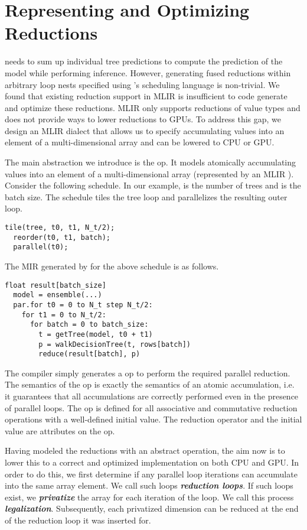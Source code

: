 \section{Representing and Optimizing Reductions}
\label{sec:reduction}
\Treebeard{} needs to sum up individual tree predictions to compute 
the prediction of the model while performing inference. However,
generating fused reductions within arbitrary loop nests specified 
using \Treebeard{}'s scheduling language is non-trivial. We found 
that existing reduction support in MLIR is insufficient to code
generate and optimize these reductions. MLIR only supports reductions
of value types and does not provide ways to lower reductions to GPUs. 
To address this gap, we design an MLIR dialect that allows us to
specify accumulating values into an element of a multi-dimensional array
and can be lowered to CPU or GPU. 

The main abstraction we introduce is the  op. It models 
atomically accumulating values into an element of a 
multi-dimensional array (represented by an MLIR ).
Consider the following \Treebeard{} schedule.
In our example,  is the number of trees 
and  is the batch size. The schedule tiles the 
tree loop and parallelizes the resulting outer loop.
\begin{lstlisting}[style=c++]
  tile(tree, t0, t1, N_t/2);
  reorder(t0, t1, batch);
  parallel(t0);
\end{lstlisting}

The MIR generated by \Treebeard{} for the above schedule is as follows. 
\begin{lstlisting}[style=c++]
  float result[batch_size]
  model = ensemble(...) 
  par.for t0 = 0 to N_t step N_t/2:
    for t1 = 0 to N_t/2:
      for batch = 0 to batch_size:
        t = getTree(model, t0 + t1) 
        p = walkDecisionTree(t, rows[batch])
        reduce(result[batch], p)
\end{lstlisting}

The compiler simply generates a  op to perform
the required parallel reduction. 
The semantics of the  op is exactly the semantics of 
an atomic accumulation, i.e. it guarantees that all accumulations 
are correctly performed even in the presence of parallel loops. 
The  op is defined for all associative and commutative
reduction operations with a well-defined initial value. The 
reduction operator and the initial value are attributes
on the  op. 

Having modeled the reductions with an abstract operation, the 
aim now is to lower this to a correct and optimized 
implementation on both CPU and GPU. In order to do this, we 
first determine if any parallel loop iterations can accumulate 
into the same array element. We call such loops 
\emph{\textbf{reduction loops}}. If such loops exist, we 
\textbf{\emph{privatize}} the array for each iteration of the
loop. We call this process \textbf{\emph{legalization}}.
Subsequently, each privatized dimension 
can be reduced at the end of the reduction loop it was inserted for. 


